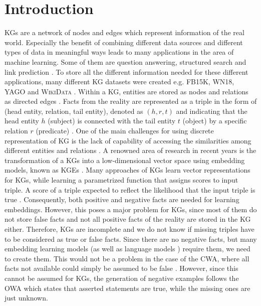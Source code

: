 \chapter{Introduction}
\label{ch:introduction}

\acp{KG} are a network of nodes and edges which represent information of the real world. 
Especially the benefit of combining different data sources and different types of data in meaningful ways leads to many applications in the area of machine learning.
Some of them are question answering, structured search \cite{zhang2019nscaching} and link prediction \cite{cai2017kbgan, Alam2020AffinityDN}.
To store all the different information needed for these different applications, many different \ac{KG} datasets were created e.g. \textsc{FB15K}, \textsc{WN18}, \textsc{YAGO} \cite{ConEx} and \textsc{WikiData} \cite{arnaoutwikinegata}.
Within a \ac{KG}, entities are stored as nodes and relations as directed edges \cite{zhang2019nscaching}.
Facts from the reality are represented as a triple in the form of (head entity, relation, tail entity), denoted as $(h, r, t)$ and indicating that the head entity $h$ (subject) is connected with the tail entity $t$ (object) by a specific relation $r$ (predicate) \cite{zhang2019nscaching, Alam2020AffinityDN}.
One of the main challenges for using discrete representation of \ac{KG} is the lack of capability of accessing the similarities among different entities and relations \cite{cai2017kbgan}. 
A renowned area of research in recent years is the transformation of a \acp{KG} into a low-dimensional vector space using embedding models, known as \acp{KGE} \cite{Alam2020AffinityDN}.
Many approaches of \acp{KG} learn vector representations for \acp{KG}, while learning a parametrized function that assigns scores to input triple.
A score of a triple expected to reflect the likelihood that the input triple is true \cite{ConvE}.
Consequently, both positive and negative facts are needed for learning embeddings. 
However, this poses a major problem for \acp{KG}, since most of them do not store false facts and not all positive facts of the reality are stored in the \ac{KG} either.
Therefore, \acp{KG} are incomplete and we do not know if missing triples have to be considered as true or false facts.
Since there are no negative facts, but many embedding learning models (as well as language models \cite{MikolovSCCD13}) require them, we need to create them.
This would not be a problem in the case of the \ac{CWA}, where all facts not available could simply be assumed to be false \cite{arnaout2020enriching}.
However, since this cannot be assumed for \acp{KG}, the generation of negative examples follows the \ac{OWA} which states that asserted statements are true, while the missing ones are just unknown.

